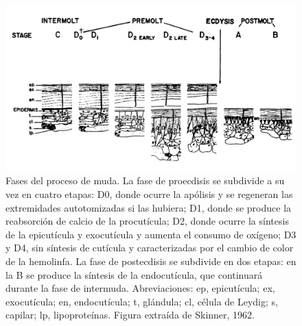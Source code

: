 \documentclass[a4paper]{article}
\begin{document}
\begin{figure}[t]
\begin{center}
\includegraphics[width=1\textwidth]{Imagen 1 (Skinner1962).png} 
\caption{Fases del proceso de muda. La fase de proecdisis se subdivide a su vez en cuatro etapas: D{\footnotesize 0}, donde ocurre la apólisis y se regeneran las extremidades autotomizadas si las hubiera; D{\footnotesize 1}, donde se produce la reabsorción de calcio de la procutícula; D{\footnotesize 2}, donde ocurre la síntesis de la epicutícula y exocutícula y aumenta el consumo de oxígeno; D{\footnotesize 3} y D{\footnotesize 4}, sin síntesis de cutícula y caracterizadas por el cambio de color de la hemolinfa. La fase de postecdisis se subdivide en dos etapas: en la B se produce la síntesis de la endocutícula, que continuará durante la fase de intermuda. Abreviaciones: ep, epicutícula; ex, exocutícula; en, endocutícula; t, glándula; cl, célula de Leydig; s, capilar; lp, lipoproteínas. Figura extraída de Skinner, 1962.}
\label{Figura 1}
\end{center}
\end{figure}
\end{document}
